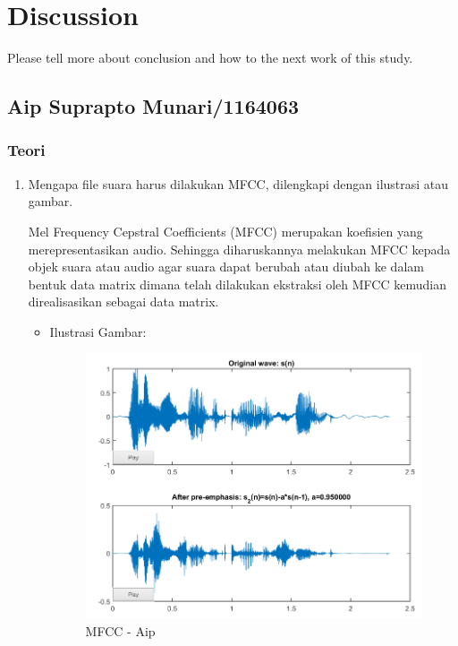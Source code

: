 \chapter{Discussion}
Please tell more about conclusion and how to the next work of this study.

\section{Aip Suprapto Munari/1164063}
\subsection{Teori}
\begin{enumerate}
\item Mengapa file suara harus dilakukan MFCC, dilengkapi dengan ilustrasi atau gambar.

Mel Frequency Cepstral Coefficients (MFCC) merupakan koefisien yang merepresentasikan audio. Sehingga diharuskannya melakukan MFCC kepada objek suara atau audio agar suara dapat berubah atau diubah ke dalam bentuk data matrix dimana telah dilakukan ekstraksi oleh MFCC kemudian direalisasikan sebagai data matrix.

\begin{itemize}
\item Ilustrasi Gambar:

\begin{figure}[ht]
\centering
\includegraphics[scale=0.7]{figures/AIP/f1.PNG}
\caption{MFCC - Aip}
\label{MFCC - Aip}
\end{figure}


\end{itemize}
\end{enumerate}
